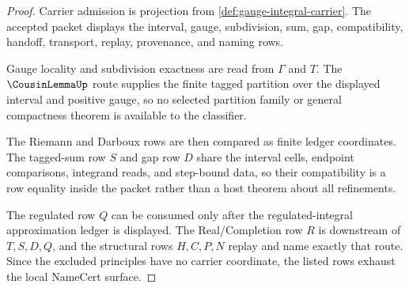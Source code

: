 \begin{proof}
Carrier admission is projection from \autoref{def:gauge-integral-carrier}. The accepted packet displays the interval, gauge, subdivision, sum, gap, compatibility, handoff, transport, replay, provenance, and naming rows.

Gauge locality and subdivision exactness are read from $\Gamma$ and $T$. The $\CousinLemmaUp$ route supplies the finite tagged partition over the displayed interval and positive gauge, so no selected partition family or general compactness theorem is available to the classifier.

The Riemann and Darboux rows are then compared as finite ledger coordinates. The tagged-sum row $S$ and gap row $D$ share the interval cells, endpoint comparisons, integrand reads, and step-bound data, so their compatibility is a row equality inside the packet rather than a host theorem about all refinements.

The regulated row $Q$ can be consumed only after the regulated-integral approximation ledger is displayed. The Real/Completion row $R$ is downstream of $T,S,D,Q$, and the structural rows $H,C,P,N$ replay and name exactly that route. Since the excluded principles have no carrier coordinate, the listed rows exhaust the local NameCert surface.
\end{proof}

